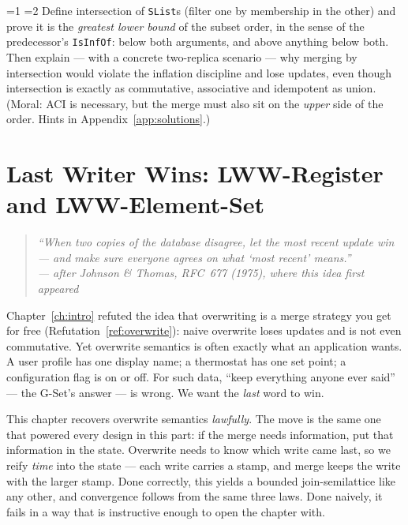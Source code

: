 \documentclass[12pt, a4paper, openright]{book}
\theoremstyle{thmstyle}
\theoremstyle{defstyle}
\newcommand{\lc}[1]{\texttt{#1}}
\newcounter{exercise}[chapter]
\renewcommand{\theexercise}{\thechapter.\arabic{exercise}}
\newenvironment{exercisebox}[1][]{%
  \refstepcounter{exercise}%
  \begin{tcolorbox}[exercisebox,
    title={Exercise \theexercise\ifx\\#1\\\else\ --- #1\fi}]%
}{\end{tcolorbox}}
\newcommand{\Stars}[1]{%
  \ifnum#1=1 \ding{72}\else\ifnum#1=2 \ding{72}\ding{72}\else
  \ding{72}\ding{72}\ding{72}\fi\fi\enspace}
\begin{document}
\begin{exercisebox}[Intersection is a meet]
  \label{ex:meet-merge}
  \Stars{3} Define intersection of \lc{SList}s (filter one by membership
  in the other) and prove it is the \emph{greatest lower bound} of the
  subset order, in the sense of the predecessor's \lc{IsInfOf}: below
  both arguments, and above anything below both. Then explain --- with a
  concrete two-replica scenario --- why merging by intersection would
  violate the inflation discipline and lose updates, even though
  intersection is exactly as commutative, associative and idempotent as
  union. (Moral: ACI is necessary, but the merge must also sit on the
  \emph{upper} side of the order. Hints in Appendix~\ref{app:solutions}.)
\end{exercisebox}
\chapter{Last Writer Wins: LWW-Register and LWW-Element-Set}
\label{ch:lww}

\begin{quote}
  \itshape
  ``When two copies of the database disagree, let the most recent
  update win --- and make sure everyone agrees on what `most recent'
  means.''\\
  --- after Johnson \& Thomas, RFC~677 (1975), where this idea first
  appeared
\end{quote}

Chapter~\ref{ch:intro} refuted the idea that overwriting is a merge
strategy you get for free (Refutation~\ref{ref:overwrite}): naive
overwrite loses updates and is not even commutative. Yet overwrite
semantics is often exactly what an application wants. A user profile has
one display name; a thermostat has one set point; a configuration flag is
on or off. For such data, ``keep everything anyone ever said'' --- the
G-Set's answer --- is wrong. We want the \emph{last} word to win.

This chapter recovers overwrite semantics \emph{lawfully}. The move is
the same one that powered every design in this part: if the merge needs
information, put that information in the state. Overwrite needs to know
which write came last, so we reify \emph{time} into the state --- each
write carries a stamp, and merge keeps the write with the larger stamp.
Done correctly, this yields a bounded join-semilattice like any other,
and convergence follows from the same three laws. Done naively, it fails
in a way that is instructive enough to open the chapter with.
\end{document}
